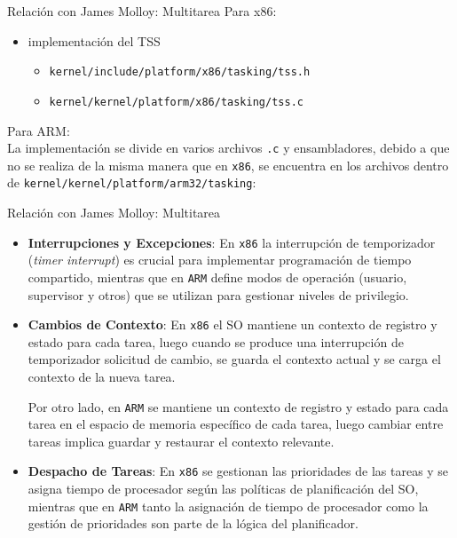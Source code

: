 \begin{frame}{Relación con James Molloy: Multitarea}
	Para x86:
	\begin{itemize} \setlength\itemsep{0pt}
		\item implementación del TSS
		\begin{itemize} \setlength\itemsep{0pt}
			\item \texttt{kernel/include/platform/x86/tasking/tss.h}
			\item \texttt{kernel/kernel/platform/x86/tasking/tss.c}
		\end{itemize}
	\end{itemize}
	
	Para ARM:\\
	La implementación se divide en varios archivos \texttt{.c} y ensambladores, debido a que no se realiza de la misma manera que en \texttt{x86}, se encuentra en los archivos dentro de
	\texttt{kernel/kernel/platform/arm32/tasking}:
\end{frame}

\begin{frame}{Relación con James Molloy: Multitarea}
	\begin{itemize} \setlength\itemsep{0pt} \footnotesize
		\item \textbf{Interrupciones y Excepciones}: En \texttt{x86} la interrupción de temporizador (\textit{timer interrupt}) es crucial para implementar programación de tiempo compartido, mientras que en \texttt{ARM} define modos de operación (usuario, supervisor y otros) que se utilizan para gestionar niveles de privilegio.
		
		\item \textbf{Cambios de Contexto}: En \texttt{x86} el SO mantiene un contexto de registro y estado para cada tarea, luego cuando se produce una interrupción de temporizador solicitud de cambio, se guarda el contexto actual y se carga el contexto de la nueva tarea.
		
		Por otro lado, en \texttt{ARM} se mantiene un contexto de registro y estado para cada tarea en el espacio de memoria específico de cada tarea, luego cambiar entre tareas implica guardar y restaurar el contexto relevante.
		
		\item \textbf{Despacho de Tareas}: En \texttt{x86} se gestionan las prioridades de las tareas y se asigna tiempo de procesador según las políticas de planificación del SO, mientras que en \texttt{ARM} tanto la asignación de tiempo de procesador como la gestión de prioridades son parte de la lógica del planificador.
	\end{itemize}
\end{frame}

